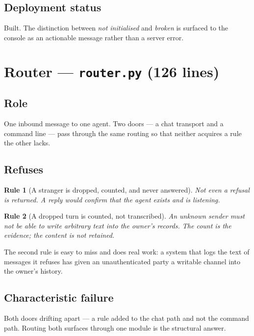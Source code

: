 \documentclass[11pt]{article}
\newtheorem{drule}{Rule}
\newcommand{\code}[1]{\texttt{\small #1}}
\begin{document}
\subsection{Deployment status}

Built. The distinction between \emph{not initialised} and \emph{broken} is surfaced to the console as an actionable message rather than a server error.

\section{Router --- \code{router.py} (126 lines)}
\label{sec:router}

\subsection{Role}

One inbound message to one agent. Two doors --- a chat transport and a command line --- pass through the same routing so that neither acquires a rule the other lacks.

\subsection{Refuses}

\begin{drule}[A stranger is dropped, counted, and never answered]
\label{rule:stranger}
Not even a refusal is returned. A reply would confirm that the agent exists and is listening.
\end{drule}

\begin{drule}[A dropped turn is counted, not transcribed]
\label{rule:notranscribe}
An unknown sender must not be able to write arbitrary text into the owner's records. The count is the evidence; the content is not retained.
\end{drule}

The second rule is easy to miss and does real work: a system that logs the text of messages it refuses has given an unauthenticated party a writable channel into the owner's history.

\subsection{Characteristic failure}

Both doors drifting apart --- a rule added to the chat path and not the command path. Routing both surfaces through one module is the structural answer.
\end{document}

